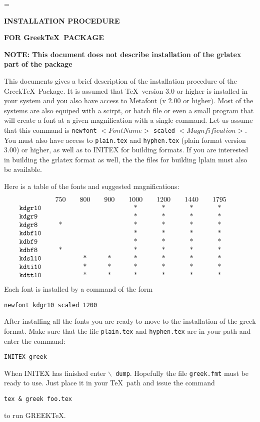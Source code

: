 %
\magnification=
\parindent=0pt
\centerline{\bf INSTALLATION PROCEDURE}
\smallskip
\centerline{\bf FOR Greek\TeX\ PACKAGE}
\bigskip
\centerline{\bf NOTE: This document does not describe installation of %
the grlatex part of the package}
\bigskip
This documents gives a brief description of the installation
procedure of the Greek\TeX\ Package. It is assumed that \TeX\ version
3.0 or higher is installed in your system and you also have access to
Metafont (v 2.00 or higher). Most of the systems are also equiped
with a scirpt, or batch file or even a small program that will create
a font at a given magnification with a single command. Let us assume
that this command is {\tt newfont} $<FontName>$ {\tt scaled}
$<Magnfification>$. You must also have access to {\tt plain.tex} and
{\tt hyphen.tex} (plain format version 3.00)  or higher, as well as
to INITEX for building formats. If you are interested in building
the grlatex format as well, the the files for building lplain must
also be available.

\medskip
{}
\smallskip
Here is a table of the fonts and suggested magnifications:
$$\vbox{\divide\hsize by2
\halign{\strut\tt #\hfill\tabskip=2em&\hfil#\hfil&\hfil#\hfil&\hfil#\hfil&%
\hfil#\hfil&\hfil#\hfil&\hfil#\hfil&\hfil#\hfil\cr
&750&800&900&1000&1200&1440&1795\cr
kdgr10&&&&*&*&*&*\cr
kdgr9&&&&*&*&*&*\cr
kdgr8&*&&&*&*&*&*\cr
kdbf10&&&&*&*&*&*\cr
kdbf9&&&&*&*&*&*\cr
kdbf8&*&&&*&*&*&*\cr
kdsl10&&*&*&*&*&*&*\cr
kdti10&&*&*&*&*&*&*\cr
kdtt10&&*&*&*&*&*&*\cr
}}
$$
Each font is installed by a command of the form\par
{\tt newfont kdgr10 scaled 1200}\par
After installing all the fonts you are ready to move to the
installation of the greek format.
\medskip
{}
\smallskip
Make sure that the file {\tt plain.tex} and {\tt hyphen.tex} are in
your path and enter the command:\par
{\tt INITEX greek}\par
When INITEX has finished enter {\tt $\backslash$ dump}. Hopefully the file
{\tt greek.fmt} must be ready to use. Just place it in your \TeX\ path
and issue the command\par
{\tt tex \& greek foo.tex}\par
to run GREEK\TeX.

